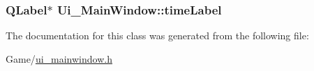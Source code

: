 \hypertarget{class_ui___main_window_a1c286339fffe4e58accecda69001e9f5}{
\subsubsection[{time\-Label}]{\setlength{\rightskip}{0pt plus 5cm}Q\-Label$\ast$ Ui\-\_\-\-Main\-Window\-::time\-Label}}\label{class_ui___main_window_a1c286339fffe4e58accecda69001e9f5}


The documentation for this class was generated from the following file\-:\begin{DoxyCompactItemize}
\item 
Game/\hyperlink{ui__mainwindow_8h}{ui\-\_\-mainwindow.\-h}\end{DoxyCompactItemize}
